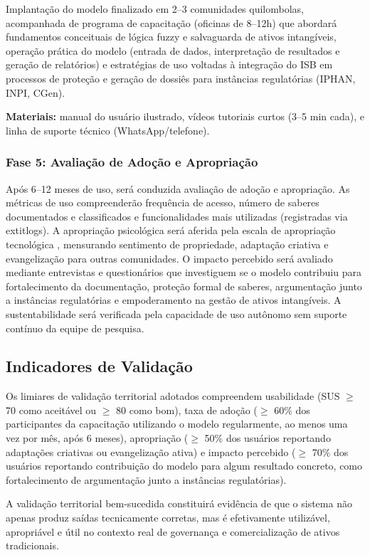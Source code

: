 Implantação do modelo finalizado em 2--3 comunidades quilombolas, acompanhada de programa de capacitação (oficinas de 8--12h) que abordará fundamentos conceituais de lógica fuzzy e salvaguarda de ativos intangíveis, operação prática do modelo (entrada de dados, interpretação de resultados e geração de relatórios) e estratégias de uso voltadas à integração do ISB em processos de proteção e geração de dossiês para instâncias regulatórias (IPHAN, INPI, CGen).

\textbf{Materiais:} manual do usuário ilustrado, vídeos tutoriais curtos (3--5 min cada), e linha de suporte técnico (WhatsApp/telefone).

\subsubsection{Fase 5: Avaliação de Adoção e Apropriação}

Após 6--12 meses de uso, será conduzida avaliação de adoção e apropriação. As métricas de uso compreenderão frequência de acesso, número de saberes documentados e classificados e funcionalidades mais utilizadas (registradas via 	extit{logs}). A apropriação psicológica será aferida pela escala de apropriação tecnológica \cite{Carroll2001}, mensurando sentimento de propriedade, adaptação criativa e evangelização para outras comunidades. O impacto percebido será avaliado mediante entrevistas e questionários que investiguem se o modelo contribuiu para fortalecimento da documentação, proteção formal de saberes, argumentação junto a instâncias regulatórias e empoderamento na gestão de ativos intangíveis. A sustentabilidade será verificada pela capacidade de uso autônomo sem suporte contínuo da equipe de pesquisa.

\subsection{Indicadores de Validação}

Os limiares de validação territorial adotados compreendem usabilidade (SUS $\geq$ 70 como aceitável ou $\geq$ 80 como bom), taxa de adoção ($\geq$ 60\% dos participantes da capacitação utilizando o modelo regularmente, ao menos uma vez por mês, após 6 meses), apropriação ($\geq$ 50\% dos usuários reportando adaptações criativas ou evangelização ativa) e impacto percebido ($\geq$ 70\% dos usuários reportando contribuição do modelo para algum resultado concreto, como fortalecimento de argumentação junto a instâncias regulatórias).

A validação territorial bem-sucedida constituirá evidência de que o sistema não apenas produz saídas tecnicamente corretas, mas é efetivamente utilizável, apropriável e útil no contexto real de governança e comercialização de ativos tradicionais.
